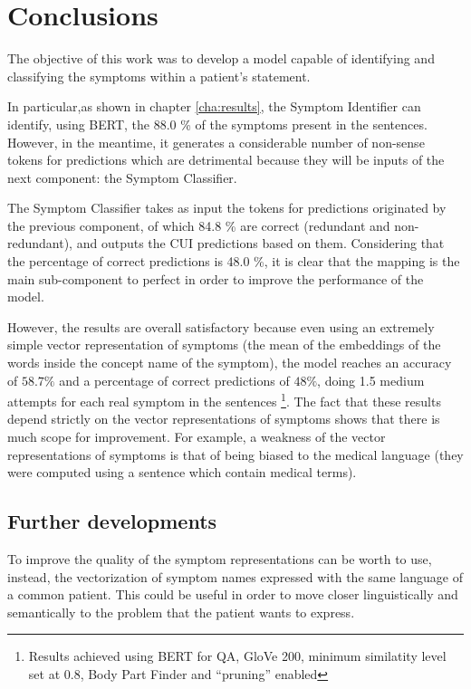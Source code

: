 \chapter{Conclusions}
\label{cha:conclusions}

The objective of this work was to develop a model capable of identifying and classifying the symptoms within a patient's statement.

In particular,as shown in chapter \ref{cha:results}, the Symptom Identifier can identify, using BERT, the 88.0 \% of the symptoms present in the sentences. However, in the meantime, it generates a considerable number of non-sense tokens for predictions which are detrimental because they will be inputs of the next component: the Symptom Classifier.

The Symptom Classifier takes as input the tokens for predictions originated by the previous component, of which 84.8 \% are correct (redundant and non-redundant), and outputs the CUI predictions based on them. Considering that the percentage of correct predictions is 48.0 \%, it is clear that the mapping is the main sub-component to perfect in order to improve the performance of the model.

However, the results are overall satisfactory because even using an extremely simple vector representation of symptoms (the mean of the embeddings of the words inside the concept name of the symptom), the model reaches an accuracy of $58.7 \%$ and a percentage of correct predictions of $48 \%$, doing 1.5 medium attempts for each real symptom in the sentences \footnote{Results achieved using BERT for QA, GloVe 200, minimum similatity level set at 0.8, Body Part Finder and ``pruning'' enabled}. The fact that these results depend strictly on the vector representations of symptoms shows that there is much scope for improvement. For example, a weakness of the vector representations of symptoms is that of being biased to the medical language (they were computed using a sentence which contain medical terms). 

\section{Further developments}
To improve the quality of the symptom representations can be worth to use, instead, the vectorization of symptom names expressed with the same language of a common patient. This could be useful in order to move closer linguistically and semantically to the problem that the patient wants to express.

